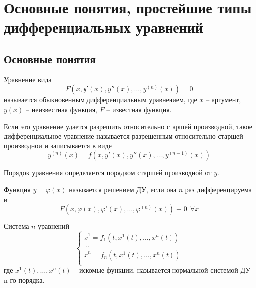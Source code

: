 



    \section{Основные понятия, простейшие типы дифференциальных уравнений}
    \subsection{Основные понятия}

    \begin{definition} 
        Уравнение вида \[F(x, y'(x), y''(x), \dots, y^{(n)}(x)) = 0\] называется обыкновенным дифференциальным уравнением,
        где $x$ -- аргумент, $y(x)$ -- неизвестная функция, $F$ -- известная функция.
    \end{definition}

    \begin{definition}
        Если это уравнение удается разрешить относительно старшей производной, такое дифференциальное
        уравнение называется разрешенным относительно старшей производной и записывается в виде 
        \[y^{(n)}(x) = f(x, y'(x), y''(x), \dots, y^{(n-1)}(x))\]
    \end{definition}

    Порядок уравнения определяется порядком старшей производной от $y$.

    \begin{definition}
        Функция $y = \varphi(x)$ называется решением ДУ, если она $n$ раз дифференцируема и 
        \[F(x, \varphi(x), \varphi'(x), \dots, \varphi^{(n)}(x)) \equiv 0 ~~ \forall x\]
    \end{definition}

    \begin{definition}
        Система $n$ уравнений
        \begin{equation*}
            \begin{cases}
                \dot x^1 = f_1(t, x^1(t), \dots, x^n(t)) \\
                \dots \\
                \dot x^n = f_n(t, x^1(t), \dots, x^n(t)) \\
            \end{cases}
        \end{equation*}
        где $x^1(t), \dots, x^n(t)$ -- искомые функции, называется нормальной системой ДУ n-го порядка.
    \end{definition}

